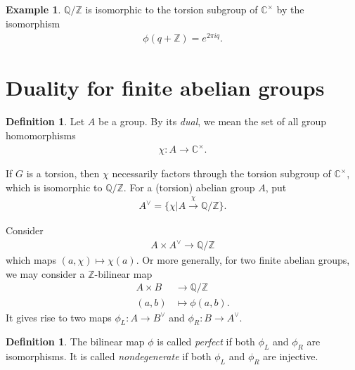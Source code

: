 \documentclass[12pt]{report}
\theoremstyle{plain}
\theoremstyle{remark}
\theoremstyle{definition}
\newtheorem{definition}[theorem]{Definition}
\newtheorem{example}[theorem]{Example}
\newcommand{\Z}{\mathbb{Z}}
\newcommand{\Q}{\mathbb{Q}}
\newcommand{\C}{\mathbb{C}}
\begin{document}
\begin{example}
    $\Q/\Z$ is isomorphic to the torsion subgroup of $\C^\times$ by the isomorphism
    \begin{align*}
        \phi(q+\Z) = e^{2\pi iq}.
    \end{align*}
\end{example}


\section{Duality for finite abelian groups}
\begin{definition}
    Let $A$ be a group. By its \emph{dual}, we mean the set of all group homomorphisms
    \begin{align*}
        \chi:A\rightarrow \C^\times.
    \end{align*}
\end{definition}

If $G$ is a torsion, then $\chi$ necessarily factors through the torsion subgroup of $\C^\times$, which is isomorphic to $\Q/\Z$. For a (torsion) abelian group $A$, put
\begin{align*}
    A^\vee = \{\chi|A\xrightarrow{\chi}\Q/\Z\}.
\end{align*}

Consider
\begin{align*}
    A\times A^\vee \rightarrow \Q/\Z
\end{align*}
which maps $(a,\chi)\mapsto \chi(a)$. Or more generally, for two finite abelian groups, we may consider a $\Z$-bilinear map
\begin{align*}
    A\times B &\rightarrow \Q/\Z \\
    (a,b) &\mapsto \phi(a,b).
\end{align*}
It gives rise to two maps $\phi_L:A\rightarrow B^\vee$ and $\phi_R : B\rightarrow A^\vee$.

\begin{definition}
    The bilinear map $\phi$ is called \emph{perfect} if both $\phi_L$ and $\phi_R$ are isomorphisms. It is called \emph{nondegenerate} if both $\phi_L$ and $\phi_R$ are injective. 
\end{definition}
\end{document}
